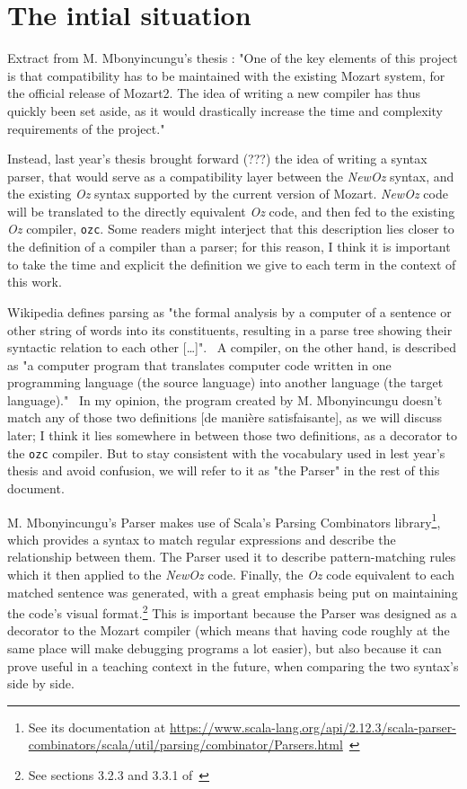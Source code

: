 \section{The intial situation}\label{sec:ch3-Parser}
Extract from M. Mbonyincungu's thesis :
"One of the key elements of this project is that compatibility has to be maintained with the existing Mozart system, for the official release of Mozart2.
The idea of writing a new compiler has thus quickly been set aside, as it would drastically increase the time and complexity requirements of the project."~\cite{jpthesis}

Instead, last year's thesis brought forward (???) the idea of writing a syntax parser, that would serve as a compatibility layer between the \textit{NewOz} syntax, and the existing \textit{Oz} syntax supported by the current version of Mozart.
\textit{NewOz} code will be translated to the directly equivalent \textit{Oz} code, and then fed to the existing \textit{Oz} compiler, \texttt{ozc}.
Some readers might interject that this description lies closer to the definition of a compiler than a parser;
for this reason, I think it is important to take the time and explicit the definition we give to each term in the context of this work.\newline

Wikipedia defines parsing as "the formal analysis by a computer of a sentence or other string of words into its constituents, resulting in a parse tree showing their syntactic relation to each other [\ldots]".~\cite{wikiParser}
A compiler, on the other hand, is described as "a computer program that translates computer code written in one programming language (the source language) into another language (the target language)."~\cite{wikiCompiler}
In my opinion, the program created by M. Mbonyincungu doesn't match any of those two definitions [de manière satisfaisante], as we will discuss later;
I think it lies somewhere in between those two definitions, as a decorator to the \texttt{ozc} compiler.
But to stay consistent with the vocabulary used in lest year's thesis and avoid confusion, we will refer to it as "the Parser" in the rest of this document.\newline

M. Mbonyincungu's Parser makes use of Scala's Parsing Combinators library\footnote{See its documentation at \url{https://www.scala-lang.org/api/2.12.3/scala-parser-combinators/scala/util/parsing/combinator/Parsers.html}~\cite{ScalaParsers}}, which provides a syntax to match regular expressions and describe the relationship between them.
The Parser used it to describe pattern-matching rules which it then applied to the \textit{NewOz} code.
Finally, the \textit{Oz} code equivalent to each matched sentence was generated, with a great emphasis being put on maintaining the code's visual format.\footnote{See sections 3.2.3 and 3.3.1 of~\cite{jpthesis}}
This is important because the Parser was designed as a decorator to the Mozart compiler (which means that having code roughly at the same place will make debugging programs a lot easier), but also because it can prove useful in a teaching context in the future, when comparing the two syntax's side by side.\newline

